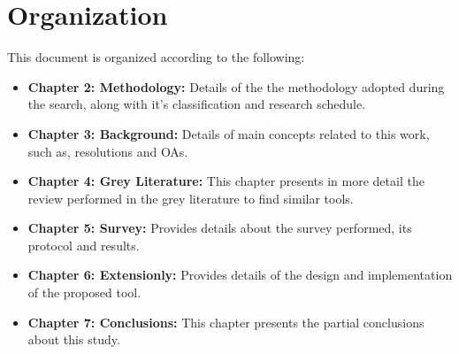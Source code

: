% 

\section{Organization}\label{sec:organization}

This document is organized according to the following:

\begin{itemize}
    \item  \textbf{Chapter 2: Methodology:} Details of the the methodology adopted during the search, along with it's classification and research schedule.
    \item  \textbf{Chapter 3: Background:} Details of main concepts related to this work, such as, resolutions and \acp{OA}.
    \item  \textbf{Chapter 4: Grey Literature:} This chapter presents in more detail the review performed in the grey literature to find similar tools.
    \item  \textbf{Chapter 5: Survey:} Provides details about the survey performed, its protocol and results.
    \item  \textbf{Chapter 6: Extensionly:} Provides details of the design and implementation
of the proposed tool.
    \item  \textbf{Chapter 7: Conclusions:} This chapter presents the partial conclusions about this study.
\end{itemize}



